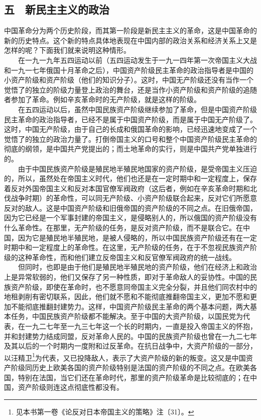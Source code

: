 \documentclass[cn,11pt,chinese]{elegantbook}
\def\myformat#1{\hfil\hfil #1}
\begin{document}
\subsection*{\myformat{五　新民主主义的政治}}
中国革命分为两个历史阶段，而其第一阶段是新民主主义的革命，这是中国革命的新的历史特点。这个新的特点具体地表现在中国内部的政治关系和经济关系上又是怎样的呢？下面我们就来说明这种情形。\\
　　在一九一九年五四运动以前（五四运动发生于一九一四年第一次帝国主义大战和一九一七年俄国十月革命之后），中国资产阶级民主革命的政治指导者是中国的小资产阶级和资产阶级（他们的知识分子）。这时，中国无产阶级还没有当作一个觉悟了的独立的阶级力量登上政治的舞台，还是当作小资产阶级和资产阶级的追随者参加了革命。例如辛亥革命时的无产阶级，就是这样的阶级。\\
　　在五四运动以后，虽然中国民族资产阶级继续参加了革命，但是中国资产阶级民主革命的政治指导者，已经不是属于中国资产阶级，而是属于中国无产阶级了。这时，中国无产阶级，由于自己的长成和俄国革命的影响，已经迅速地变成了一个觉悟了的独立的政治力量了。打倒帝国主义的口号和整个中国资产阶级民主革命的彻底的纲领，是中国共产党提出的；而土地革命的实行，则是中国共产党单独进行的。\\
　　由于中国民族资产阶级是殖民地半殖民地国家的资产阶级，是受帝国主义压迫的，所以，虽然处在帝国主义时代，他们也还是在一定时期中和一定程度上，保存着反对外国帝国主义和反对本国官僚军阀政府（这后者，例如在辛亥革命时期和北伐战争时期）的革命性，可以同无产阶级、小资产阶级联合起来，反对它们所愿意反对的敌人。这是中国资产阶级和旧俄帝国的资产阶级的不同之点。在旧俄帝国，因为它已经是一个军事封建的帝国主义，是侵略别人的，所以俄国的资产阶级没有什么革命性。在那里，无产阶级的任务，是反对资产阶级，而不是联合它。在中国，因为它是殖民地半殖民地，是被人侵略的，所以中国民族资产阶级还有在一定时期中和一定程度上的革命性。在这里，无产阶级的任务，在于不忽视民族资产阶级的这种革命性，而和他们建立反帝国主义和反官僚军阀政府的统一战线。\\
　　但同时，也即是由于他们是殖民地半殖民地的资产阶级，他们在经济上和政治上是异常软弱的，他们又保存了另一种性质，即对于革命敌人的妥协性。中国的民族资产阶级，即使在革命时，也不愿意同帝国主义完全分裂，并且他们同农村中的地租剥削有密切联系，因此，他们就不愿和不能彻底推翻帝国主义，更加不愿和更加不能彻底推翻封建势力。这样，中国资产阶级民主革命的两个基本问题，两大基本任务，中国民族资产阶级都不能解决。至于中国的大资产阶级，以国民党为代表，在一九二七年至一九三七年这一个长的时期内，一直是投入帝国主义的怀抱，并和封建势力结成同盟，反对革命人民的。中国的民族资产阶级也曾在一九二七年及其以后的一个时期内一度附和过反革命。在抗日战争中，大资产阶级的一部分，以汪精卫\footnote[13]{ 见本书第一卷《论反对日本帝国主义的策略》注〔31〕。}为代表，又已投降敌人，表示了大资产阶级的新的叛变。这又是中国资产阶级同历史上欧美各国的资产阶级特别是法国的资产阶级的不同之点。在欧美各国，特别在法国，当它们还在革命时代，那里的资产阶级革命是比较彻底的；在中国，资产阶级则连这点彻底性都没有。\\
\end{document}
